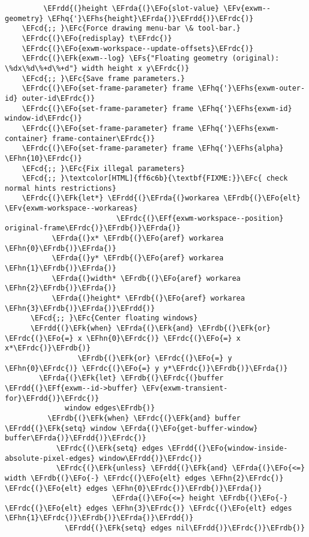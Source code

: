 \documentclass[a4wide,10pt]{article}
\newcommand{\EFc}[1]{\textcolor{EFc}{#1}} %
\newcommand{\EFcd}[1]{\textcolor{EFcd}{#1}} %
\newcommand{\EFs}[1]{\textcolor{EFs}{#1}} %
\newcommand{\EFk}[1]{\textcolor{EFk}{#1}} %
\newcommand{\EFf}[1]{\textcolor{EFf}{#1}} %
\newcommand{\EFv}[1]{\textcolor{EFv}{#1}} %
\newcommand{\EFo}[1]{\textcolor{EFo}{#1}} %
\newcommand{\EFhn}[1]{\textcolor{EFhn}{\textbf{#1}}} %
\newcommand{\EFhq}[1]{\textcolor{EFhq}{#1}} %
\newcommand{\EFhs}[1]{\textcolor{EFhs}{#1}} %
\newcommand{\EFrda}[1]{\textcolor{EFrda}{#1}} %
\newcommand{\EFrdb}[1]{\textcolor{EFrdb}{#1}} %
\newcommand{\EFrdc}[1]{\textcolor{EFrdc}{#1}} %
\newcommand{\EFrdd}[1]{\textcolor{EFrdd}{#1}} %
\begin{document}
\begin{Code}
\begin{Verbatim}
         \EFrdd{(}height \EFrda{(}\EFo{slot-value} \EFv{exwm--geometry} \EFhq{'}\EFhs{height}\EFrda{)}\EFrdd{)}\EFrdc{)}
    \EFcd{;; }\EFc{Force drawing menu-bar \& tool-bar.}
    \EFrdc{(}\EFo{redisplay} t\EFrdc{)}
    \EFrdc{(}\EFo{exwm-workspace--update-offsets}\EFrdc{)}
    \EFrdc{(}\EFk{exwm--log} \EFs{"Floating geometry (original): \%dx\%d\%+d\%+d"} width height x y\EFrdc{)}
    \EFcd{;; }\EFc{Save frame parameters.}
    \EFrdc{(}\EFo{set-frame-parameter} frame \EFhq{'}\EFhs{exwm-outer-id} outer-id\EFrdc{)}
    \EFrdc{(}\EFo{set-frame-parameter} frame \EFhq{'}\EFhs{exwm-id} window-id\EFrdc{)}
    \EFrdc{(}\EFo{set-frame-parameter} frame \EFhq{'}\EFhs{exwm-container} frame-container\EFrdc{)}
    \EFrdc{(}\EFo{set-frame-parameter} frame \EFhq{'}\EFhs{alpha} \EFhn{10}\EFrdc{)}
    \EFcd{;; }\EFc{Fix illegal parameters}
    \EFcd{;; }\textcolor[HTML]{ff6c6b}{\textbf{FIXME:}}\EFc{ check normal hints restrictions}
    \EFrdc{(}\EFk{let*} \EFrdd{(}\EFrda{(}workarea \EFrdb{(}\EFo{elt} \EFv{exwm-workspace--workareas}
                          \EFrdc{(}\EFf{exwm-workspace--position} original-frame\EFrdc{)}\EFrdb{)}\EFrda{)}
           \EFrda{(}x* \EFrdb{(}\EFo{aref} workarea \EFhn{0}\EFrdb{)}\EFrda{)}
           \EFrda{(}y* \EFrdb{(}\EFo{aref} workarea \EFhn{1}\EFrdb{)}\EFrda{)}
           \EFrda{(}width* \EFrdb{(}\EFo{aref} workarea \EFhn{2}\EFrdb{)}\EFrda{)}
           \EFrda{(}height* \EFrdb{(}\EFo{aref} workarea \EFhn{3}\EFrdb{)}\EFrda{)}\EFrdd{)}
      \EFcd{;; }\EFc{Center floating windows}
      \EFrdd{(}\EFk{when} \EFrda{(}\EFk{and} \EFrdb{(}\EFk{or} \EFrdc{(}\EFo{=} x \EFhn{0}\EFrdc{)} \EFrdc{(}\EFo{=} x x*\EFrdc{)}\EFrdb{)}
                 \EFrdb{(}\EFk{or} \EFrdc{(}\EFo{=} y \EFhn{0}\EFrdc{)} \EFrdc{(}\EFo{=} y y*\EFrdc{)}\EFrdb{)}\EFrda{)}
        \EFrda{(}\EFk{let} \EFrdb{(}\EFrdc{(}buffer \EFrdd{(}\EFf{exwm--id->buffer} \EFv{exwm-transient-for}\EFrdd{)}\EFrdc{)}
              window edges\EFrdb{)}
          \EFrdb{(}\EFk{when} \EFrdc{(}\EFk{and} buffer \EFrdd{(}\EFk{setq} window \EFrda{(}\EFo{get-buffer-window} buffer\EFrda{)}\EFrdd{)}\EFrdc{)}
            \EFrdc{(}\EFk{setq} edges \EFrdd{(}\EFo{window-inside-absolute-pixel-edges} window\EFrdd{)}\EFrdc{)}
            \EFrdc{(}\EFk{unless} \EFrdd{(}\EFk{and} \EFrda{(}\EFo{<=} width \EFrdb{(}\EFo{-} \EFrdc{(}\EFo{elt} edges \EFhn{2}\EFrdc{)} \EFrdc{(}\EFo{elt} edges \EFhn{0}\EFrdc{)}\EFrdb{)}\EFrda{)}
                         \EFrda{(}\EFo{<=} height \EFrdb{(}\EFo{-} \EFrdc{(}\EFo{elt} edges \EFhn{3}\EFrdc{)} \EFrdc{(}\EFo{elt} edges \EFhn{1}\EFrdc{)}\EFrdb{)}\EFrda{)}\EFrdd{)}
              \EFrdd{(}\EFk{setq} edges nil\EFrdd{)}\EFrdc{)}\EFrdb{)}

\end{Verbatim}
\end{Code}
\end{document}
